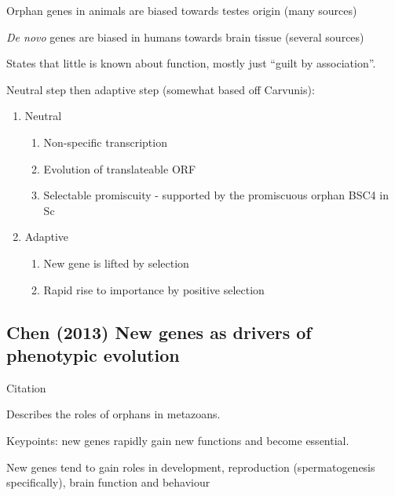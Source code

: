     Orphan genes in animals are biased towards testes origin (many sources)

    \textit{De novo} genes are biased in humans towards brain tissue
    (several sources)

    States that little is known about function, mostly just ``guilt by
    association''.

    Neutral step then adaptive step (somewhat based off Carvunis):
\begin{enumerate}
    
    \item Neutral
    
        \begin{enumerate}
            
            \item Non-specific transcription
            \item Evolution of translateable ORF
            \item Selectable promiscuity - supported by the promiscuous
                orphan BSC4 in Sc \cite{cai_novo_2008}

        \end{enumerate}
        
    \item Adaptive
    
        \begin{enumerate}
            
            \item New gene is lifted by selection
            \item Rapid rise to importance by positive selection
        
        \end{enumerate}

\end{enumerate}

\subsection{Chen (2013) New genes as drivers of phenotypic evolution}

    Citation \cite{chen_new_2013}

    Describes the roles of orphans in metazoans.

    Keypoints: new genes rapidly gain new functions and become essential.

    New genes tend to gain roles in development, reproduction
    (spermatogenesis specifically), brain function and behaviour

